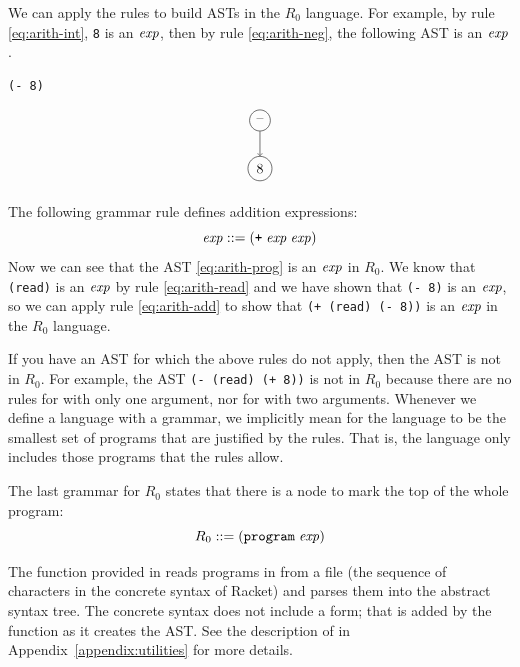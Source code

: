 \documentclass[11pt]{book}
\begin{document}
We can apply the rules to build ASTs in the $R_0$
language. For example, by rule \eqref{eq:arith-int}, \texttt{8} is an
$\mathit{exp}$, then by rule \eqref{eq:arith-neg}, the following AST is
an $\mathit{exp}$.
\begin{center}
\begin{minipage}{0.25\textwidth}
\begin{lstlisting}
(- 8)
\end{lstlisting}
\end{minipage}
\begin{minipage}{0.25\textwidth}
\begin{equation}
\begin{tikzpicture}
 \node[draw, circle] (minus) at (0, 0)  {$\text{--}$};
 \node[draw, circle] (8)     at (0, -1.2) {$8$};

 \draw[->] (minus) to (8);
\end{tikzpicture}
\label{eq:arith-neg8}
\end{equation}
\end{minipage}
\end{center}

The following grammar rule defines addition expressions:
\begin{equation}
  \mathit{exp} ::= (\texttt{+} \; \mathit{exp} \; \mathit{exp}) \label{eq:arith-add}
\end{equation}
Now we can see that the AST \eqref{eq:arith-prog} is an $\mathit{exp}$ in
$R_0$.  We know that \lstinline{(read)} is an $\mathit{exp}$ by rule
\eqref{eq:arith-read} and we have shown that \texttt{(- 8)} is an
$\mathit{exp}$, so we can apply rule \eqref{eq:arith-add} to show that
\texttt{(+ (read) (- 8))} is an $\mathit{exp}$ in the $R_0$ language.

If you have an AST for which the above rules do not apply, then the
AST is not in $R_0$. For example, the AST \texttt{(- (read) (+ 8))} is
not in $R_0$ because there are no rules for \key{+} with only one
argument, nor for \key{-} with two arguments.  Whenever we define a
language with a grammar, we implicitly mean for the language to be the
smallest set of programs that are justified by the rules. That is, the
language only includes those programs that the rules allow.

The last grammar for $R_0$ states that there is a  node
to mark the top of the whole program:
\[
  R_0 ::= (\texttt{program} \; \mathit{exp})
\]

The  function provided in 
reads programs in from a file (the sequence of characters in the
concrete syntax of Racket) and parses them into the abstract syntax
tree. The concrete syntax does not include a  form; that
is added by the  function as it creates the
AST. See the description of  in
Appendix~\ref{appendix:utilities} for more details.
\end{document}
